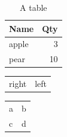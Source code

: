 \documentclass[11pt]{article}
\date{\today}
\title{}
\begin{document}
\tableofcontents

\begin{table}[htbp]
\caption{\label{tab:org7bfd295}A table}
\centering
\begin{tabular}{lr}
Name & Qty\\
\hline
apple & 3\\
pear & 10\\
\end{tabular}
\end{table}

\begin{center}
\begin{tabular}{rl}
right & left\\
\end{tabular}
\end{center}

\begin{center}
\begin{tabular}{ll}
a & b\\
c & d\\
\end{tabular}
\end{center}
\end{document}
